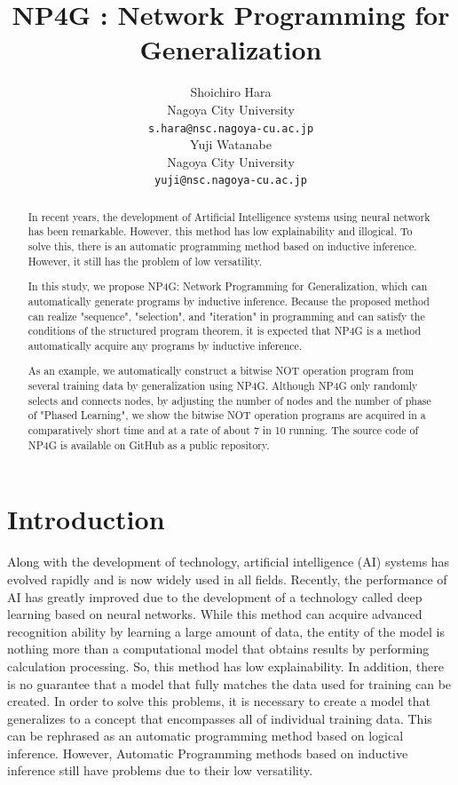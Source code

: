 \documentclass{article}
\title{NP4G : Network Programming for Generalization
}
\author{
  Shoichiro Hara \\
  Nagoya City University \\
  \texttt{s.hara@nsc.nagoya-cu.ac.jp} \\
   \And
  Yuji Watanabe \\
  Nagoya City University \\
  \texttt{yuji@nsc.nagoya-cu.ac.jp} \\
}
\begin{document}
\maketitle

\begin{abstract}
In recent years, the development of Artificial Intelligence systems using neural network has been remarkable. 
However, this method has low explainability and illogical.
To solve this, there is an automatic programming method based on inductive inference.
However, it still has the problem of low versatility.
 
 In this study, we propose NP4G: Network Programming for Generalization, which can automatically generate programs by inductive inference. 
Because the proposed method can realize "sequence", "selection", and "iteration" in programming and can satisfy the conditions of the structured program theorem, it is expected that NP4G is a method automatically acquire any programs by inductive inference.
 
 As an example, we automatically construct a bitwise NOT operation program from several training data by generalization using NP4G. 
 Although NP4G only randomly selects and connects nodes, by adjusting the number of nodes and the number of phase of "Phased Learning", we show the bitwise NOT operation programs are acquired in a comparatively short time and at a rate of about 7 in 10 running.
 The source code of NP4G is available on GitHub as a public repository\footnotemark[1].
\end{abstract}



\section{Introduction}
Along with the development of technology, artificial intelligence (AI) systems has evolved rapidly and is now widely used in all fields.
Recently, the performance of AI has greatly improved due to the development of a technology called deep learning based on neural networks.
While this method can acquire advanced recognition ability by learning a large amount of data, the entity of the model is nothing more than a computational model that obtains results by performing calculation processing. 
So, this method has low explainability.
In addition, there is no guarantee that a model that fully matches the data used for training can be created.
In order to solve this problems, it is necessary to create a model that generalizes to a concept that encompasses all of individual training data.
This can be rephrased as an automatic programming method based on logical inference.
However, Automatic Programming methods based on inductive inference still have problems due to their low versatility.
\end{document}
